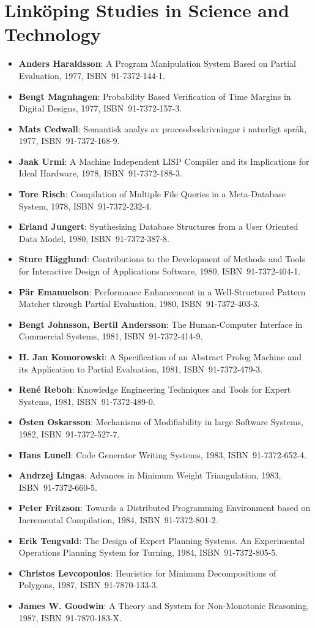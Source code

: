 \documentclass[a4paper,showtrims,twocolumn]{memoir}
\title{}
\newcommand{\adjustlayout}{
  \setlength{\trimtop}{\stockheight}
  \addtolength{\trimtop}{-\paperheight}
  \setlength{\trimedge}{\stockwidth}
  \addtolength{\trimedge}{-\paperwidth}
  \settrims{0.5\trimtop}{0.5\trimedge}
  \setlrmargins{*}{*}{1.5}
  \setulmargins{2cm}{*}{*}
}
\newcommand{\series}[1]{\section*{\footnotesize #1}}
\newenvironment{theses}{
  \begin{itemize}
    \setlength{\itemsep}{0.2em}
    \setlength{\parskip}{0em}
    \setlength{\parsep}{0em}
}{
  \end{itemize}
}
\newcommand{\thesis}[5]{\item[No.~#1] \textbf{#2}: #3, #4, ISBN~#5.}
\begin{document}
  \adjustlayout
  \checkandfixthelayout
  \pagestyle{empty}
  \maketitle
  \thispagestyle{empty}
  \fontsize{6}{7}
  \selectfont
  \raggedright

  \series{Linköping Studies in Science and Technology}

  \begin{theses}
    \thesis{14}{Anders Haraldsson}{A Program Manipulation System Based on Partial Evaluation}{1977}{91-7372-144-1}
    \thesis{17}{Bengt Magnhagen}{Probability Based Verification of Time Margins in Digital Designs}{1977}{91-7372-157-3}
    \thesis{18}{Mats Cedwall}{Semantisk analys av processbeskrivningar i naturligt språk}{1977}{91-7372-168-9}
    \thesis{22}{Jaak Urmi}{A Machine Independent LISP Compiler and its Implications for Ideal Hardware}{1978}{91-7372-188-3}
    \thesis{33}{Tore Risch}{Compilation of Multiple File Queries in a Meta-Database System}{1978}{91-7372-232-4}
    \thesis{51}{Erland Jungert}{Synthesizing Database Structures from a User Oriented Data Model}{1980}{91-7372-387-8}
    \thesis{54}{Sture Hägglund}{Contributions to the Development of Methods and Tools for Interactive Design of Applications Software}{1980}{91-7372-404-1}
    \thesis{55}{Pär Emanuelson}{Performance Enhancement in a Well-Structured Pattern Matcher through Partial Evaluation}{1980}{91-7372-403-3}
    \thesis{58}{Bengt Johnsson, Bertil Andersson}{The Human-Computer Interface in Commercial Systems}{1981}{91-7372-414-9}
    \thesis{69}{H. Jan Komorowski}{A Specification of an Abstract Prolog Machine and its Application to Partial Evaluation}{1981}{91-7372-479-3}
    \thesis{71}{René Reboh}{Knowledge Engineering Techniques and Tools for Expert Systems}{1981}{91-7372-489-0}
    \thesis{77}{Östen Oskarsson}{Mechanisms of Modifiability in large Software Systems}{1982}{91-7372-527-7}
    \thesis{94}{Hans Lunell}{Code Generator Writing Systems}{1983}{91-7372-652-4}
    \thesis{97}{Andrzej Lingas}{Advances in Minimum Weight Triangulation}{1983}{91-7372-660-5}
    \thesis{109}{Peter Fritzson}{Towards a Distributed Programming Environment based on Incremental Compilation}{1984}{91-7372-801-2}
    \thesis{111}{Erik Tengvald}{The Design of Expert Planning Systems. An Experimental Operations Planning System for Turning}{1984}{91-7372-805-5}
    \thesis{155}{Christos Levcopoulos}{Heuristics for Minimum Decompositions of Polygons}{1987}{91-7870-133-3}
    \thesis{165}{James W. Goodwin}{A Theory and System for Non-Monotonic Reasoning}{1987}{91-7870-183-X}

\end{theses}
\end{document}
